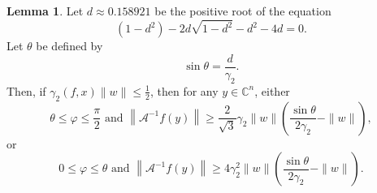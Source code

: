\documentclass[12pt,oneside,reqno]{amsart}
\theoremstyle{definition}
\newtheorem{lem}[thm]{Lemma}
\begin{document}
		\begin{lem}
			Let $d\approx 0.158921$ be the positive root of the equation 
			\begin{equation*}
			(1-d^2)-2d\sqrt{1-d^2}-d^2 -4d=0.
			\end{equation*}
			Let $\theta$ be defined by 
			\begin{equation*}
			\sin \theta=\frac{d}{\gamma_2}.
			\end{equation*}
			Then, if $\gamma_2(f,x)\|w\|\leq \frac{1}{2}$, then for any $y\in \mathbb{C}^n$, either
			\[\theta\leq \varphi\leq \frac{\pi}{2}\text{ and }\left\|\mathcal{A}^{-1}f(y)\right\|\geq \frac{2}{\sqrt{3}}\gamma_2\|w\|\left(\frac{\sin\theta}{2\gamma_2}-\|w\|\right),\]
			or
			\[0\leq \varphi \leq \theta \text{ and }\left\|\mathcal{A}^{-1}f(y)\right\|\geq 4\gamma_2^2\|w\|\left(\frac{\sin\theta}{2\gamma_2}-\|w\|\right).\]
		\end{lem}
\end{document}

